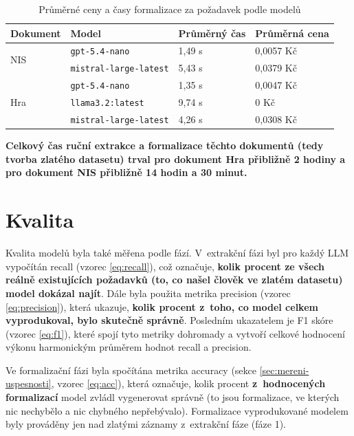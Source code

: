 \documentclass[czech, bc, kiv, he, iso690numb, pdf]{fasthesis}
\begin{document}
\begin{table}[h!]
\centering
\caption{Průměrné ceny a časy formalizace za požadavek podle modelů}
\label{tab:prumerne-casy-formalizace}
\begin{tabularx}{\textwidth}{llXX}
\hline\hline
\textbf{Dokument} & \textbf{Model} & \textbf{Průměrný čas} & \textbf{Průměrná cena} \\
\midrule
\multirow{2}{*}{NIS}
    & \texttt{gpt-5.4-nano}         & 1,49 s~& 0,0057 Kč \\
    & \texttt{mistral-large-latest} & 5,43 s~& 0,0379 Kč \\
\midrule
\multirow{3}{*}{Hra}
    & \texttt{gpt-5.4-nano}         & 1,35 s~& 0,0047 Kč \\
    & \texttt{llama3.2:latest}      & 9,74 s~& 0 Kč \\
    & \texttt{mistral-large-latest} & 4,26 s~& 0,0308 Kč \\
\hline\hline
\end{tabularx}
\end{table}

\textbf{Celkový čas ruční extrakce a formalizace těchto dokumentů (tedy tvorba zlatého datasetu) trval pro dokument Hra přibližně 2 hodiny a pro dokument NIS přibližně 14 hodin a 30 minut.}

\section{Kvalita}\label{sec:vyhodnoceni-kvalita}
Kvalita modelů byla také měřena podle fází. V~extrakční fázi byl pro každý LLM vypočítán recall (vzorec \ref{eq:recall}), což označuje, \textbf{kolik procent ze všech reálně existujících požadavků (to, co našel člověk ve zlatém datasetu) model dokázal najít}. Dále byla použita metrika precision (vzorec \ref{eq:precision}), která ukazuje, \textbf{kolik procent z~toho, co model celkem vyprodukoval, bylo skutečně správně}. Posledním ukazatelem je F1 skóre (vzorec \ref{eq:f1}), které spojí tyto metriky dohromady a vytvoří celkové hodnocení výkonu harmonickým průměrem hodnot recall a precision.

Ve formalizační fázi byla spočítána metrika accuracy (sekce \ref{sec:mereni-uspesnosti}, vzorec \ref{eq:acc}), která označuje, kolik procent \textbf{z~hodnocených formalizací} model zvládl vygenerovat správně (to jsou formalizace, ve kterých nic nechybělo a nic chybného nepřebývalo). Formalizace vyprodukované modelem byly prováděny jen nad zlatými záznamy z~extrakční fáze (fáze 1). 
\end{document}
